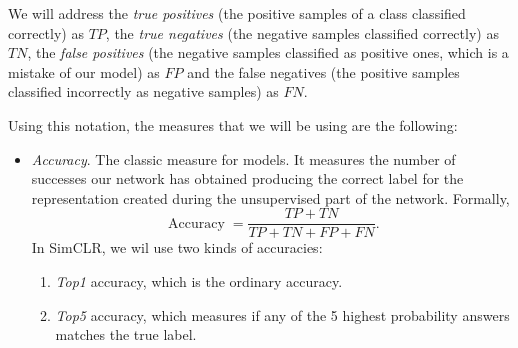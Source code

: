 \begin{notation}
We will address the \emph{true positives} (the positive samples of a class classified correctly) as $TP$, the \emph{true negatives} (the negative samples classified correctly) as $TN$, the \emph{false positives} (the negative samples classified as positive ones, which is a mistake of our model) as $FP$ and the false negatives (the positive samples classified incorrectly as negative samples) as $FN$.
\end{notation}

Using this notation, the measures that we will be using are the following:

\begin{itemize}
\item \emph{Accuracy}. The classic measure for models. It measures the number of successes our network has obtained producing the correct label for the representation created during the unsupervised part of the network. Formally,
\[
\operatorname{Accuracy} = \frac{TP + TN}{TP + TN + FP + FN}  .  
\] 
In SimCLR, we wil use two kinds of accuracies:
\begin{enumerate}
\item \emph{Top1} accuracy, which is the ordinary accuracy.
\item \emph{Top5} accuracy, which measures if any of the 5 highest probability answers matches the true label.
\end{enumerate}
\end{itemize}




